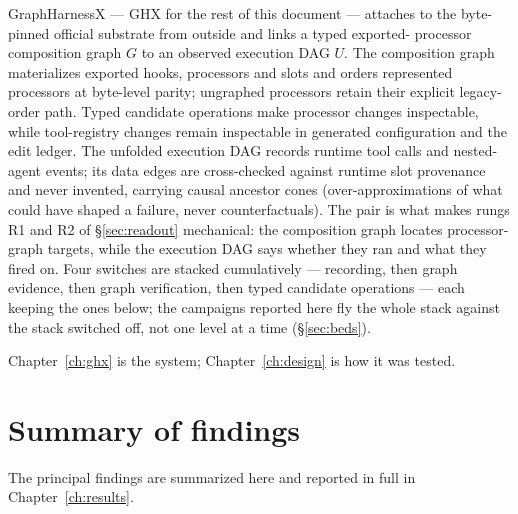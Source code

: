 GraphHarnessX --- GHX for the rest of this document --- attaches to the
byte-pinned official substrate from outside and links a typed exported-
processor composition graph $G$ to an observed execution DAG $U$. The
composition graph materializes exported hooks, processors and slots and
orders represented processors at byte-level parity; ungraphed processors
retain their explicit legacy-order path. Typed candidate operations make
processor changes inspectable, while tool-registry changes remain
inspectable in generated configuration and the edit ledger. The unfolded
execution DAG records runtime tool calls and nested-agent events; its data
edges are cross-checked against runtime slot provenance and never invented,
carrying
causal ancestor cones (over-approximations of what could have shaped a
failure, never counterfactuals). The pair is what makes rungs R1 and R2 of
\S\ref{sec:readout} mechanical: the composition graph locates
processor-graph targets, while the execution DAG says whether they ran and
what they fired on. Four switches are stacked cumulatively --- recording,
then graph evidence, then graph verification, then typed candidate
operations --- each keeping the ones below; the campaigns reported
here fly the whole stack against the stack switched off, not one level at
a time (\S\ref{sec:beds}).

Chapter~\ref{ch:ghx} is the system; Chapter~\ref{ch:design} is how it was
tested.

\section{Summary of findings}
\label{sec:verdict}

The principal findings are summarized here and reported in full in Chapter~\ref{ch:results}.

